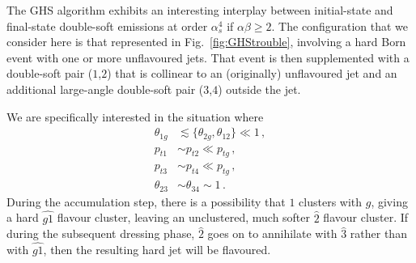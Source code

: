 \documentclass[nofootinbib,twocolumn,preprintnumbers,superscriptaddress,aps]{revtex4-2}
\newcommand{\as}{\alpha_s}
\begin{document}
The GHS algorithm exhibits an interesting interplay between initial-state and final-state double-soft emissions at order $\as^4$ if $\alpha\beta \ge 2$.
%
The configuration that we consider here is that represented in
Fig.~\ref{fig:GHStrouble}, involving a hard Born event with one or more
unflavoured jets.
%
That event is then supplemented with a double-soft pair ($1$,$2$) that
is collinear to an (originally) unflavoured jet and an additional
large-angle double-soft pair ($3$,$4$) outside the jet.

We are specifically interested in the situation where
\begin{subequations}
  \begin{align}
    \theta_{1g} &\lesssim \{ \theta_{2g} , \theta_{12}\} \ll 1\,,
    \\
    p_{t1} &\sim p_{t2} \ll p_{tg}\,,
    \\
    p_{t3} &\sim p_{t4} \ll p_{tg}\,,
    \\
    \theta_{23} &\sim \theta_{34} \sim 1\,.
  \end{align}
\end{subequations}
%
During the accumulation step, there is a possibility that $1$ clusters
with $g$, giving a hard $\widehat{g1}$ flavour cluster, leaving an
unclustered, much softer $\hat 2$ flavour cluster.
%
If during the subsequent dressing phase, $\hat 2$ goes on to
annihilate with $\hat 3$ rather than with $\widehat{g1}$, then the
resulting hard jet will be flavoured.
\end{document}
